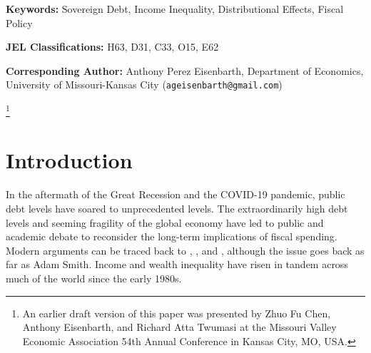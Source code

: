 \documentclass[12pt, titlepage]{article}
\numberwithin{equation}{section}
\newcommand\blfootnote[1]{%
	\begingroup
	\renewcommand\thefootnote{}\footnote{#1}%
	\addtocounter{footnote}{-1}%
	\endgroup
}
\begin{document}
\begin{titlepage}
        \vspace{6mm}
		\noindent \small{\textbf{Keywords:} Sovereign Debt, Income Inequality, Distributional Effects, Fiscal Policy} 

        \vspace{6mm}
		\noindent \small{\textbf{JEL Classifications:} H63, D31, C33, O15, E62} 
        
        \vspace{6mm}
		\noindent \small{\textbf{Corresponding Author:} Anthony Perez Eisenbarth, Department of Economics, University of Missouri-Kansas City (\texttt{ageisenbarth@gmail.com})}

    \blfootnote{An earlier draft version of this paper was presented by Zhuo Fu Chen, Anthony Eisenbarth, and Richard Atta Twumasi at the Missouri Valley Economic Association 54th Annual Conference in Kansas City, MO, USA.}
	\end{titlepage}
    

\section{Introduction}

In the aftermath of the Great Recession and the COVID-19 pandemic, public debt levels have soared to unprecedented levels. The extraordinarily high debt levels and seeming fragility of the global economy have led to public and academic debate to reconsider the long-term implications of fiscal spending. Modern arguments can be traced back to \cite{Buchanan1958}, \cite{Meade1958}, and \cite{Modigliani1961}, although the issue goes back as far as Adam Smith. Income and wealth inequality have risen in tandem across much of the world since the early 1980s.
\end{document}
